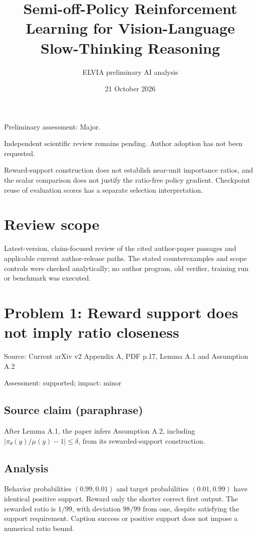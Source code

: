\documentclass[11pt]{article}
\begin{document}
\title{Semi-off-Policy Reinforcement Learning for Vision-Language Slow-Thinking Reasoning}

\author{ELVIA preliminary AI analysis}\date{21 October 2026}\maketitle

Preliminary assessment: Major.\par

Independent scientific review remains pending. Author adoption has not been requested.

Reward-support construction does not establish near-unit importance ratios, and the scalar comparison does not justify the ratio-free policy gradient. Checkpoint reuse of evaluation scores has a separate selection interpretation.

\section*{Review scope}

Latest-version, claim-focused review of the cited author-paper passages and applicable current author-release paths. The stated counterexamples and scope controls were checked analytically; no author program, old verifier, training run or benchmark was executed.

\section*{Problem 1: Reward support does not imply ratio closeness}

Source: Current arXiv v2 Appendix A, PDF p.17, Lemma A.1 and Assumption A.2

Assessment: supported; impact: minor

\subsection*{Source claim (paraphrase)}

After Lemma A.1, the paper infers Assumption A.2, including \(|\pi_\theta(y)/\mu(y)-1|\leq\delta\), from its rewarded-support construction.

\subsection*{Analysis}

Behavior probabilities \((0.99,0.01)\) and target probabilities \((0.01,0.99)\) have identical positive support. Reward only the shorter correct first output. The rewarded ratio is \(1/99\), with deviation \(98/99\) from one, despite satisfying the support requirement. Caption success or positive support does not impose a numerical ratio bound.
\end{document}
